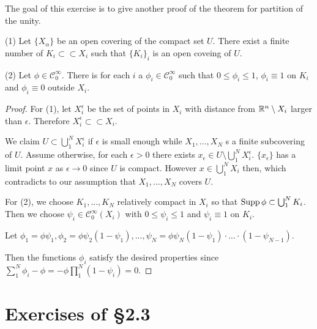\documentclass[
    ]{article}
\begin{document}
    \begin{exercise}
        The goal of this exercise is to give another proof of the theorem for partition of the unity.

        (1) Let $\{X_\alpha\}$ be an open covering of the compact set $U$. 
        There exist a finite number of $K_i\subset\subset X_i$ such that 
        $\{K_i\}_i$ is an open coveing of $U$.

        (2) Let $\phi\in\mathscr C_0^\infty$. There is for each $i$ a $\phi_i\in\mathscr C_0^\infty$ such that $0\le\phi_i\le1$, $\phi_i\equiv1$ on $K_i$ and $\phi_i\equiv0$ outside $X_i$.
    \end{exercise}
    \begin{proof}
    For (1), let $X_i^\epsilon$ be the set of points in $X_i$ with distance from $\mathbb{R}^n\setminus X_i$ larger than $\epsilon$. Therefore $X_i^\epsilon\subset\subset X_i$. 
    
    We claim $U\subset \bigcup_1^NX_i^\epsilon$ if $\epsilon$ is small enough while $X_1,...,X_N$ s a finite subcovering of $U$. Assume otherwise, for each $\epsilon>0$ there exists 
    $x_\epsilon\in U\setminus\bigcup_1^NX_i^\epsilon$. $\{x_\epsilon\}$ has a limit point $x$ as $\epsilon\to0$ since $U$ is compact. 
    However $x\in\bigcup_1^NX_i$ then, which contradicts to our assumption that $X_1,...,X_N$ covers $U$.

    For (2), we choose $K_1,...,K_N$ relatively compact in $X_i$ so that $\operatorname{Supp}\phi\subset\bigcup_1^NK_i$.  
    Then we choose $\psi_i\in\mathscr C_0^\infty(X_i)$ with $0\le\psi_i\le1$ and $\psi_i\equiv1$ on $K_i$. 
   
    Let $\phi_1=\phi\psi_1,\phi_2=\phi\psi_2(1-\psi_1),...,\psi_N=\phi\psi_N(1-\psi_1)\cdot...\cdot(1-\psi_{N-1}).$
    
    Then the functions $\phi_i$ satisfy the desired properties since $\sum_1^N\phi_i-\phi=-\phi\prod_1^N(1-\psi_i)=0.$
    \end{proof}



\section{Exercises of \S 2.3}






    
\end{document}
